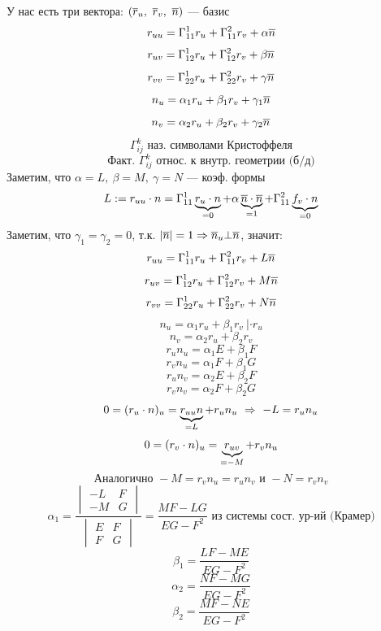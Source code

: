 \documentclass[main]{subriles}
\begin{document}
    У нас есть три вектора: $(\ol{r}_u,\ \ol{r}_v,\ \ol{n})$ --- базис
    \[r_{uu} = \Gamma_{11}^1 r_u + \Gamma_{11}^2 r_v + \alpha \ol{n}\]
    \[r_{uv} = \Gamma_{12}^1 r_u + \Gamma_{12}^2 r_v + \beta \ol{n}\]
    \[r_{vv} = \Gamma_{22}^1 r_u + \Gamma_{22}^2 r_v + \gamma \ol{n}\]
    \[n_u = \alpha_1 r_u + \beta_1 r_v + \gamma_1 \ol{n}\]
    \[n_v = \alpha_2 r_u + \beta_2 r_v + \gamma_2 \ol{n}\]
    \[\Gamma_{ij}^k \text{ наз. символами Кристоффеля}\]
    \[\text{Факт. } \Gamma_{ij}^k \text{ относ. к внутр. геометрии (б/д)}\]
    Заметим, что $\alpha = L,\ \beta = M,\ \gamma = N$ --- коэф.  формы
    \[L := r_{uu} \cdot n = \Gamma_{11}^1 \ub{=0}{r_u \cdot n} + \alpha \ub{=1}{\ol{n} \cdot \ol{n}} + \Gamma_{11}^2 \ub{=0}{f_v \cdot n}\]
    Заметим, что $\gamma_1 = \gamma_2 = 0$, т.к. $|\ol{n}| = 1 \Ra \ol{n}_u \bot \ol{n}$, значит:
    \[r_{uu} = \Gamma_{11}^1 r_u + \Gamma_{11}^2 r_v + L \ol{n}\]
    \[r_{uv} = \Gamma_{12}^1 r_u + \Gamma_{12}^2 r_v + M \ol{n}\]
    \[r_{vv} = \Gamma_{22}^1 r_u + \Gamma_{22}^2 r_v + N \ol{n}\]
    \[n_u = \alpha_1 r_u + \beta_1 r_v \ |\cdot r_u\]
    \[n_v = \alpha_2 r_u + \beta_2 r_v \]
    \[r_u n_u = \alpha_1 E + \beta_1 F\]
    \[r_v n_u = \alpha_1 F + \beta_1 G\]
    \[r_u n_v = \alpha_2 E + \beta_2 F\]
    \[r_v n_v = \alpha_2 F + \beta_2 G\]
    \[0 = (r_u \cdot n)_u = \ub{=L}{r_{uu} n} + r_u n_u \RA -L = r_u n_u\]
    \[0 = (r_v \cdot n)_u = \ub{=-M}{r_{uv}} + r_v n_u\]
    \[\text{Аналогично }-M = r_v n_u = r_u n_v \text{ и } -N = r_v n_v\]
    \[\alpha_1 = \frac{\begin{vmatrix}
      -L & F\\
      -M & G
    \end{vmatrix}}{\begin{vmatrix}
      E & F\\
      F & G
    \end{vmatrix}} = \frac{MF - LG}{EG - F^2} \text{ из системы сост. ур-ий (Крамер)}\]
    \[\beta_1 = \frac{LF - ME}{EG - F^2}\]
    \[\alpha_2 = \frac{NF - MG}{EG - F^2}\]
    \[\beta_2 = \frac{MF - NE}{EG - F^2}\]
\end{document}
